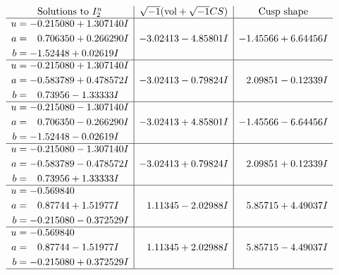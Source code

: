 \documentclass[1p]{elsarticle_modified}
\theoremstyle{definition}
\newcommand{\I}{\sqrt{-1}}
\begin{document}
$$\begin{array}{c|c|c}  
\text{Solutions to }I^u_{2}& \I (\text{vol} + \sqrt{-1}CS) & \text{Cusp shape}\\
 \hline 
\begin{aligned}
u &= -0.215080 + 1.307140 I \\
a &= \phantom{-}0.706350 + 0.266290 I \\
b &= -1.52448 + 0.02619 I\end{aligned}
 & -3.02413 - 4.85801 I & -1.45566 + 6.64456 I \\ \hline\begin{aligned}
u &= -0.215080 + 1.307140 I \\
a &= -0.583789 + 0.478572 I \\
b &= \phantom{-}0.73956 - 1.33333 I\end{aligned}
 & -3.02413 - 0.79824 I & \phantom{-}2.09851 - 0.12339 I \\ \hline\begin{aligned}
u &= -0.215080 - 1.307140 I \\
a &= \phantom{-}0.706350 - 0.266290 I \\
b &= -1.52448 - 0.02619 I\end{aligned}
 & -3.02413 + 4.85801 I & -1.45566 - 6.64456 I \\ \hline\begin{aligned}
u &= -0.215080 - 1.307140 I \\
a &= -0.583789 - 0.478572 I \\
b &= \phantom{-}0.73956 + 1.33333 I\end{aligned}
 & -3.02413 + 0.79824 I & \phantom{-}2.09851 + 0.12339 I \\ \hline\begin{aligned}
u &= -0.569840\phantom{ +0.000000I} \\
a &= \phantom{-}0.87744 + 1.51977 I \\
b &= -0.215080 - 0.372529 I\end{aligned}
 & \phantom{-}1.11345 - 2.02988 I & \phantom{-}5.85715 + 4.49037 I \\ \hline\begin{aligned}
u &= -0.569840\phantom{ +0.000000I} \\
a &= \phantom{-}0.87744 - 1.51977 I \\
b &= -0.215080 + 0.372529 I\end{aligned}
 & \phantom{-}1.11345 + 2.02988 I & \phantom{-}5.85715 - 4.49037 I\\
 \hline 
 \end{array}$$\newpage
\end{document}
